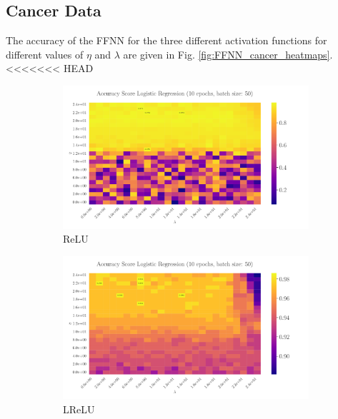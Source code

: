 \documentclass[%
reprint,
amsmath,amssymb,
aps,
]{revtex4-2}
\begin{document}
\subsection{Cancer Data}
The accuracy of the FFNN for the three different activation functions for different values of $\eta$ and $\lambda$ are given in Fig. \ref{fig:FFNN_cancer_heatmaps}.
<<<<<<< HEAD

\begin{figure}
	\begin{subfigure}{0.497\textwidth}
		\includegraphics[width=\textwidth]{Python/Figures/LogReg25x25_epoch10_batchS50.pdf}
		\caption{ReLU}
		\label{fig:LogReg25x25_epoch10_bacthS50}
	\end{subfigure}
	\hfill
	\begin{subfigure}{0.497\textwidth}
		\includegraphics[width=\textwidth]{Python/Figures/LogReg25x25_epoch10_batchS50_zoomed.pdf}
		\caption{LReLU}
		\label{fig:LogReg25x25_epoch10_bacthS50_zoomed}
	\end{subfigure}
\hfill\newline
	\begin{subfigure}{0.497\textwidth}

\end{subfigure}
\end{figure}
\end{document}
